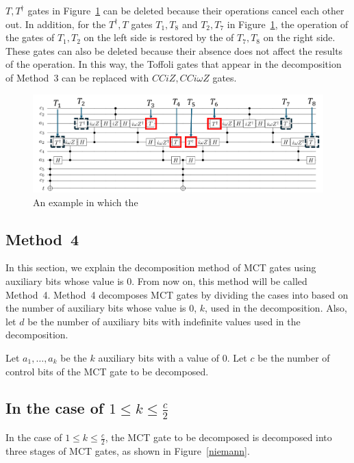 $T, T^{\dag}$ gates in Figure~\ref{baker_cciomegaz} can be deleted because their operations cancel each other out.
In addition, for the $T^{\dag}, T$ gates $T_{1}, T_{8}$ and $T_{2}, T_{7}$ in Figure~\ref{baker_cciomegaz}, the operation of the  gates of $T_{1}, T_{2}$ on the left side is restored by the  of $T_{7}, T_{8}$ on the right side. 
These gates can also be deleted because their absence does not affect the results of the operation.
In this way, the Toffoli gates that appear in the decomposition of Method~3 can be replaced with $CCiZ, CCi\omega Z$ gates.
\begin{figure}[tbp]
\centering
\includegraphics[width=0.95\linewidth]{img/baker_iomegaz.pdf}
\caption{An example in which the }
\label{baker_cciomegaz}
\end{figure}
\subsection{Method~4}
In this section,
we explain the decomposition method\cite{niemann2019t} of MCT gates using auxiliary bits whose value is 0.
From now on, this method will be called Method~4.
Method~4 decomposes MCT gates by dividing the cases into based on the number of auxiliary bits whose value is 0, $k$, used in the decomposition.
Also, let $d$ be the number of auxiliary bits with indefinite values used in the decomposition.

Let $a_{1},\dots, a_{k}$ be the $k$ auxiliary bits with a value of 0. Let $c$ be the number of control bits of the MCT gate to be decomposed.

\subsection*{In the case of $1\leq k \leq \frac{c}{2}$}

In the case of $1\leq k \leq \frac{c}{2}$,
the MCT gate to be decomposed is decomposed into three stages of MCT gates, as shown in Figure~\ref{niemann}.

